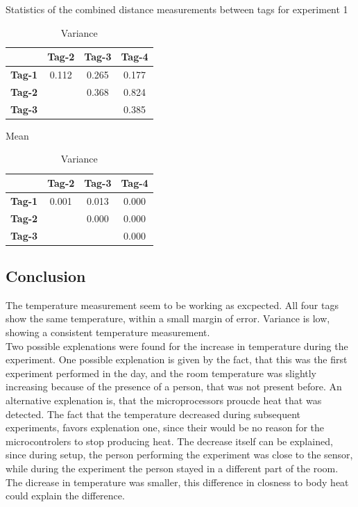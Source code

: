 \begin{table}[ht]
\centering
\caption{Statistics of the combined distance measurements between tags for experiment 1}
\begin{minipage}{0.45\textwidth}
\centering
\begin{tabular}{|c|c c c|}
\hline
		& \textbf{Tag-2} & \textbf{Tag-3} & \textbf{Tag-4} \\
\hline
\textbf{Tag-1}    & 0.112 & 0.265 & 0.177 \\
\textbf{Tag-2}   &  & 0.368 & 0.824 \\
\textbf{Tag-3}   &  &  & 0.385 \\
\hline
\end{tabular}
\caption*{Mean}
\end{minipage}
\hfill
\begin{minipage}{0.45\textwidth}
\centering
\begin{tabular}{|c|c c c|}
\hline
		& \textbf{Tag-2} & \textbf{Tag-3} & \textbf{Tag-4} \\
\hline
\textbf{Tag-1}    & 0.001 & 0.013 & 0.000 \\
\textbf{Tag-2}   &  & 0.000 & 0.000 \\
\textbf{Tag-3}   &  &  & 0.000 \\
\hline
\end{tabular}
\caption*{Variance}
\end{minipage}
\label{tab:exp1_var_distanc}
\end{table}


\subsection{Conclusion}
\label{s:exp1_conclustion}
The temperature measurement seem to be working as excpected.
All four tags show the same temperature, within a small margin of error.
Variance is low, showing a consistent temperature measurement.\\
Two possible explenations were found for the increase in temperature during the experiment.
One possible explenation is given by the fact, that this was the first experiment performed in the day, and the room temperature was slightly increasing because of the presence of a person, that was not present before.
An alternative explenation is, that the microprocessors proucde heat that was detected.
The fact that the temperature decreased during subsequent experiments, favors explenation one, since their would be no reason for the microcontrolers to stop producing heat.
The decrease itself can be explained, since during setup, the person performing the experiment was close to the sensor, while during the experiment the person stayed in a different part of the room. The dicrease in temperature was smaller, this difference in closness to body heat could explain the difference.


